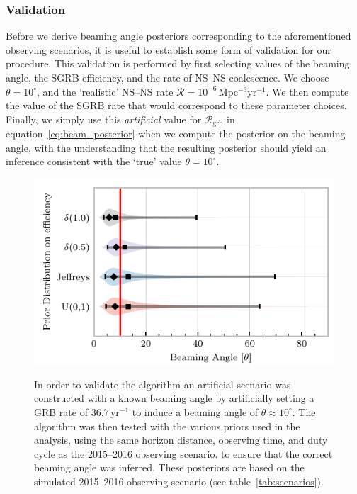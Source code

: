 \documentclass[twocolumn]{aastex61}
\newcommand{\grbrate}{{{\mathcal R}_{\mathrm{grb}}}}
\newcommand{\cbcrate}{{{\mathcal R}}}
\newcommand{\yr}{\mathrm{yr}}
\newcommand{\BNS}{\ac{NS}--\ac{NS}\xspace}
\begin{document}
\subsubsection{Validation}
Before we derive beaming angle posteriors corresponding to the
aforementioned observing scenarios, it is useful to establish some
form of validation for our procedure.  This validation is performed by
first selecting values of the beaming angle, the \ac{SGRB} efficiency,
and the rate of \BNS coalescence.  We choose $\theta=10^{\circ}$, and
the `realistic' \BNS rate $\cbcrate = 10^{-6}$\,Mpc$^{-3}$yr$^{-1}$.
We then compute the value of the \ac{SGRB} rate that would correspond
to these parameter choices.  Finally, we simply use this
\emph{artificial} value for $\grbrate$ in
equation~\ref{eq:beam_posterior} when we compute the posterior on the
beaming angle, with the understanding that the resulting posterior
should yield an inference consistent with the `true' value
$\theta=10^{\circ}$.
%
\begin{figure}%
\centering
{\includegraphics[width=\linewidth]{O1_injections_violin.pdf}}
\caption{ In order to validate the algorithm an artificial scenario
  was constructed with a known beaming angle by artificially setting a
  GRB rate of $36.7\, \yr^{-1}$ to induce a beaming angle of $\theta \approx 10^{\circ}$.
  The algorithm was then tested with the various priors used in the
  analysis,  using
  the same horizon distance, observing time, and duty cycle as the 2015--2016
  observing scenario. to ensure that the correct beaming angle was inferred. 
  These posteriors are based on the simulated 2015--2016 observing scenario (see
  table~\ref{tab:scenarios}).
  \label{fig:injjetposterio2016}}
\end{figure}
\end{document}
